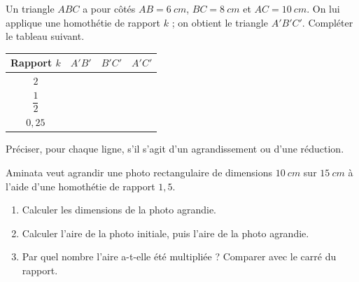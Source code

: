 \documentclass[11pt]{article}
\begin{document}
\begin{exercice}
Un triangle $ABC$ a pour côtés $AB = \SI{6}{cm}$, $BC = \SI{8}{cm}$ et $AC = \SI{10}{cm}$. On lui applique une homothétie de rapport $k$ ; on obtient le triangle $A'B'C'$. Compléter le tableau suivant.

\begin{center}
\begin{tabular}{|c|c|c|c|}
\hline
Rapport $k$ & $A'B'$ & $B'C'$ & $A'C'$ \\
\hline
$2$ & & & \\
\hline
$\dfrac{1}{2}$ & & & \\
\hline
$0{,}25$ & & & \\
\hline
\end{tabular}
\end{center}

Préciser, pour chaque ligne, s'il s'agit d'un agrandissement ou d'une réduction.
\end{exercice}

\begin{exercice}
Aminata veut agrandir une photo rectangulaire de dimensions $\SI{10}{cm}$ sur $\SI{15}{cm}$ à l'aide d'une homothétie de rapport $1{,}5$.
\begin{enumerate}
  \item Calculer les dimensions de la photo agrandie.
  \item Calculer l'aire de la photo initiale, puis l'aire de la photo agrandie.
  \item Par quel nombre l'aire a-t-elle été multipliée ? Comparer avec le carré du rapport.
\end{enumerate}
\end{exercice}
\end{document}
